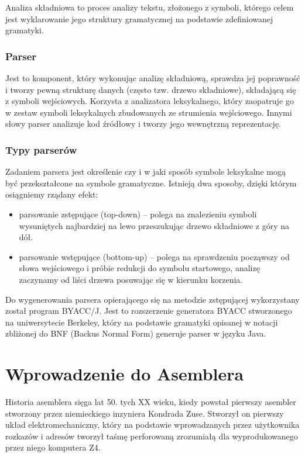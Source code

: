 \documentclass[a4paper,12pt]{article}
\begin{document}
Analiza składniowa to proces analizy tekstu, złożonego z symboli, którego celem jest wyklarowanie jego struktury gramatycznej na podstawie zdefiniowanej gramatyki.

\subsubsection{Parser}

Jest to komponent, który wykonując analizę składniową, sprawdza jej poprawność i tworzy pewną strukturę danych (często tzw. drzewo składniowe), składającą się z symboli wejściowych. Korzysta z analizatora leksykalnego, który zaopatruje go w zestaw symboli leksykalnych zbudowanych ze strumienia wejściowego. Innymi słowy parser analizuje kod źródłowy i tworzy jego wewnętrzną reprezentację.

\subsubsection{Typy parserów}

Zadaniem parsera jest określenie czy i w jaki sposób symbole leksykalne mogą być przekształcone na symbole gramatyczne. Istnieją dwa sposoby, dzięki którym osiągniemy rządany efekt:
\begin{itemize}
	\item parsowanie zstępujące (top-down) -- polega na znalezieniu symboli wysuniętych najbardziej na lewo przeszukując drzewo składniowe z góry na dół.
	\item parsowanie wstępujące (bottom-up) -- polega na sprawdzeniu począwszy od słowa wejściowego i próbie redukcji do symbolu startowego, analizę zaczynamy od liści drzewa posuwając się w kierunku korzenia.
\end{itemize}

Do wygenerowania parsera opierającego się na metodzie zstępującej wykorzystany został program BYACC/J\citep{byaccj}. Jest to rozszerzenie generatora BYACC stworzonego na uniwersytecie Berkeley\cite{byacc}, który na podstawie gramatyki opisanej w notacji zbliżonej do BNF (Backus Normal Form)\cite{BNF} generuje parser w języku Java.

\newpage

\section{Wprowadzenie do Asemblera}

Historia asemblera sięga lat 50. tych XX wieku, kiedy powstał pierwszy asembler stworzony przez niemieckiego inzyniera Kondrada Zuse. Stworzył on pierwszy układ elektromechaniczny, który na podstawie wprowadzanych przez użytkownika rozkazów i adresów tworzył taśmę perforowaną zrozumiałą dla wyprodukowanego przez niego komputera Z4.
\end{document}

